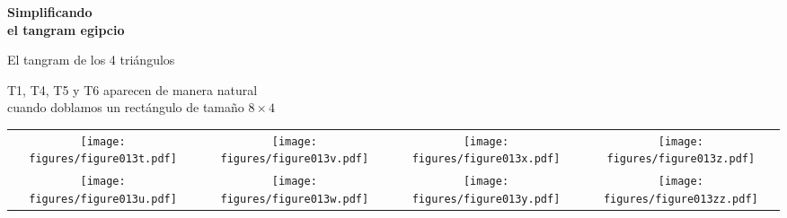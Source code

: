 \documentclass[14pt,aspectratio=169,usenames,dvipsnames]{beamer}
\begin{document}
    \begin{frame}{}
        \begin{center}
            \textbf{\huge Simplificando\\el tangram egipcio}
        \end{center}
    \end{frame}


    \begin{frame}{El tangram de los 4 triángulos}
        \begin{center}
            T1, T4, T5 y T6 aparecen de manera natural\\[1ex]cuando doblamos un rectángulo de tamaño $8\!\times\!4$
            \bigskip\bigskip

            \begin{tabular}{cccc}
                \texttt{[image: figures/figure013t.pdf]} &
                \texttt{[image: figures/figure013v.pdf]} &
                \texttt{[image: figures/figure013x.pdf]} &
                \texttt{[image: figures/figure013z.pdf]} \\[2ex]
                \texttt{[image: figures/figure013u.pdf]} &
                \texttt{[image: figures/figure013w.pdf]} &
                \texttt{[image: figures/figure013y.pdf]} &
                \texttt{[image: figures/figure013zz.pdf]} \\
            \end{tabular}

            \bigskip\bigskip
        \end{center}
    \end{frame}

\end{document}
